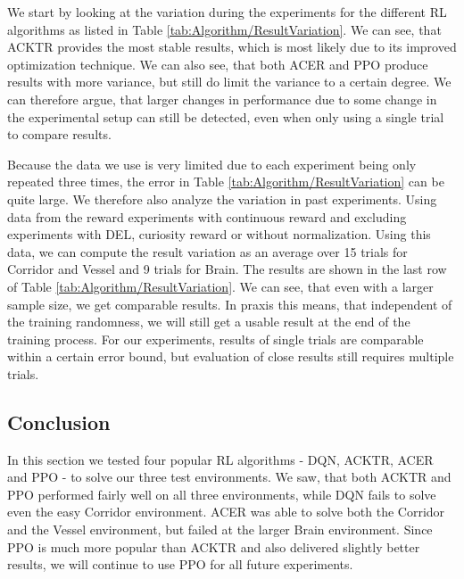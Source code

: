 We start by looking at the variation during the experiments for the different RL algorithms as listed in Table \ref{tab:Algorithm/ResultVariation}. We can see, that ACKTR provides the most stable results, which is most likely due to its improved optimization technique. We can also see, that both ACER and PPO produce results with more variance, but still do limit the variance to a certain degree. We can therefore argue, that larger changes in performance due to some change in the experimental setup can still be detected, even when only using a single trial to compare results. 

Because the data we use is very limited due to each experiment being only repeated three times, the error in Table \ref{tab:Algorithm/ResultVariation} can be quite large. We therefore also analyze the variation in past experiments. Using data from the reward experiments with continuous reward and excluding experiments with DEL, curiosity reward or without normalization. Using this data, we can compute the result variation as an average over 15 trials for Corridor and Vessel and 9 trials for Brain. The results are shown in the last row of Table \ref{tab:Algorithm/ResultVariation}. We can see, that even with a larger sample size, we get comparable results. In praxis this means, that independent of the training randomness, we will still get a usable result at the end of the training process. For our experiments, results of single trials are comparable within a certain error bound, but evaluation of close results still requires multiple trials.

\subsection{Conclusion}
In this section we tested four popular RL algorithms - DQN, ACKTR, ACER and PPO - to solve our three test environments. We saw, that both ACKTR and PPO performed fairly well on all three environments, while DQN fails to solve even the easy Corridor environment. ACER was able to solve both the Corridor and the Vessel environment, but failed at the larger Brain environment. Since PPO is much more popular than ACKTR and also delivered slightly better results, we will continue to use PPO for all future experiments. 


